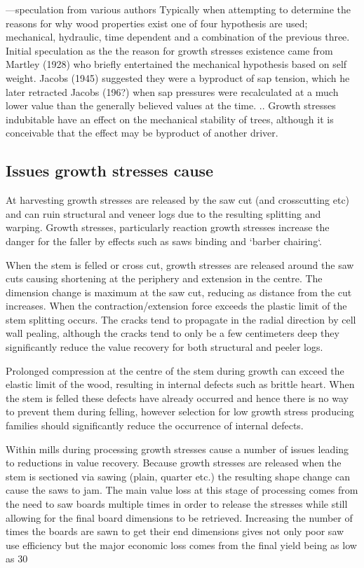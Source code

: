 \documentclass{article}
\begin{document}
---speculation from various authors
Typically when attempting to determine the reasons for why wood properties exist
one of four hypothesis are used; mechanical, hydraulic, time dependent and a
combination of the previous three. Initial speculation as the the reason for
growth stresses existence came from Martley (1928) who briefly entertained the
mechanical hypothesis based on self weight. Jacobs (1945) suggested they were a
byproduct of sap tension, which he later retracted Jacobs (196?) when sap
pressures were recalculated at a much lower value than the generally believed
values at the time. .. Growth stresses indubitable have an effect on the
mechanical stability of trees, although it is conceivable that the effect may be
byproduct of another driver.


\subsection{Issues growth stresses cause }

At harvesting growth stresses are released by the saw cut (and crosscutting etc)
and can ruin structural and veneer logs due to the resulting splitting and
warping. Growth stresses, particularly reaction growth stresses increase the
danger for the faller by effects such as saws binding and `barber chairing`.

When the stem is felled or cross cut, growth stresses are released around the
saw cuts causing shortening at the periphery and extension in the centre. The
dimension change is maximum at the saw cut, reducing as distance from the cut
increases. When the contraction/extension force exceeds the plastic limit of the
stem splitting occurs. The cracks tend to propagate in the radial direction by
cell wall pealing, although the cracks tend to only be a few centimeters deep
they significantly reduce the value recovery for both structural and peeler logs.

Prolonged compression at the centre of the stem during growth can exceed the
elastic limit of the wood, resulting in internal defects such as brittle heart.
When the stem is felled these defects have already occurred and hence there is
no way to prevent them during felling, however selection for low growth stress
producing families should significantly reduce the occurrence of internal
defects.

Within mills during processing growth stresses cause a number of issues leading
to reductions in value recovery. Because growth stresses are released when the
stem is sectioned via sawing (plain, quarter etc.) the resulting shape change
can cause the saws to jam. The main value loss at this stage of processing comes
from the need to saw boards multiple times in order to release the stresses
while still allowing for the final board dimensions to be retrieved.
Increasing the number of times the boards are sawn to get their end dimensions
gives not only poor saw use efficiency but the major economic loss comes from the
final yield being as low as 30%
\end{document}
